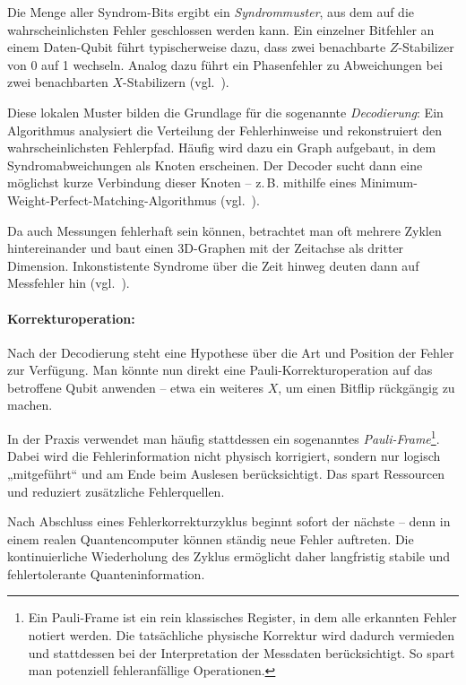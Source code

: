 Die Menge aller Syndrom-Bits ergibt ein \emph{Syndrommuster}, aus dem auf die wahrscheinlichsten Fehler geschlossen werden kann. Ein einzelner Bitfehler an einem Daten-Qubit führt typischerweise dazu, dass zwei benachbarte \(Z\)-Stabilizer von 0 auf 1 wechseln. Analog dazu führt ein Phasenfehler zu Abweichungen bei zwei benachbarten \(X\)-Stabilizern (vgl.~\cite[7]{fowler_surface_2012}).

Diese lokalen Muster bilden die Grundlage für die sogenannte \emph{Decodierung}: Ein Algorithmus analysiert die Verteilung der Fehlerhinweise und rekonstruiert den wahrscheinlichsten Fehlerpfad. Häufig wird dazu ein Graph aufgebaut, in dem Syndromabweichungen als Knoten erscheinen. Der Decoder sucht dann eine möglichst kurze Verbindung dieser Knoten – z.\,B. mithilfe eines Minimum-Weight-Perfect-Matching-Algorithmus (vgl.~\cite[10-11]{fowler_surface_2012}).

Da auch Messungen fehlerhaft sein können, betrachtet man oft mehrere Zyklen hintereinander und baut einen 3D-Graphen mit der Zeitachse als dritter Dimension. Inkonstistente Syndrome über die Zeit hinweg deuten dann auf Messfehler hin (vgl.~\cite[2]{wu_micro_2025}).

\paragraph{Korrekturoperation:}

Nach der Decodierung steht eine Hypothese über die Art und Position der Fehler zur Verfügung. Man könnte nun direkt eine Pauli-Korrekturoperation auf das betroffene Qubit anwenden – etwa ein weiteres \(X\), um einen Bitflip rückgängig zu machen.

In der Praxis verwendet man häufig stattdessen ein sogenanntes \emph{Pauli-Frame}\footnote{Ein Pauli-Frame ist ein rein klassisches Register, in dem alle erkannten Fehler notiert werden. Die tatsächliche physische Korrektur wird dadurch vermieden und stattdessen bei der Interpretation der Messdaten berücksichtigt. So spart man potenziell fehleranfällige Operationen.}. Dabei wird die Fehlerinformation nicht physisch korrigiert, sondern nur logisch „mitgeführt“ und am Ende beim Auslesen berücksichtigt. Das spart Ressourcen und reduziert zusätzliche Fehlerquellen.

Nach Abschluss eines Fehlerkorrekturzyklus beginnt sofort der nächste – denn in einem realen Quantencomputer können ständig neue Fehler auftreten. Die kontinuierliche Wiederholung des Zyklus ermöglicht daher langfristig stabile und fehlertolerante Quanteninformation.

